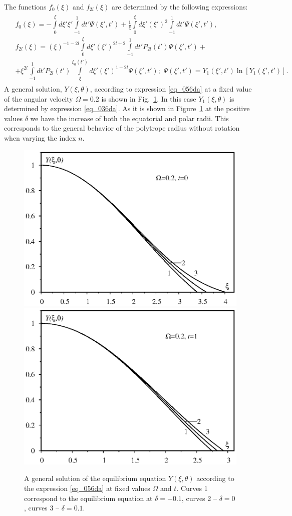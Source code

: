 \documentclass{caosp308}
\begin{document}
The functions $f_0(\xi)$ and $f_{2l}(\xi)$ are determined by the following expressions:
\begin{eqnarray}
\label{eq_057da}
\begin{split}
& f_{0}(\xi)=-\int\limits_0^{\xi}d\xi'\xi'\int\limits_{-1}^{1}dt'\Psi(\xi',t')+\frac{1}{\xi}\int\limits_0^\xi d\xi'(\xi')^2
\int\limits_{-1}^{1}dt'\Psi(\xi',t'),\\
& f_{2l}(\xi)=(\xi)^{-1-2l}\int\limits_0^\xi d\xi'(\xi')^{2l+2}\int\limits_{-1}^{1}dt'P_{2l}(t')\Psi(\xi',t')+\\
&+\xi^{2l}\int\limits_{-1}^{1}dt'P_{2l}(t')\int\limits_{\xi}^{\xi_0(t')}d\xi'(\xi')^{1-2l}\Psi(\xi',t');\,\,
\Psi(\xi',t')=Y_1(\xi',t')\ln{[Y_1(\xi',t')]}.
\end{split}
\end{eqnarray}
A general solution, $Y(\xi,\theta)$, according to expression \eqref{eq_056da} at a fixed value of the angular velocity $\Omega=0.2$ is shown in Fig.~\ref{fig_05da}. In this case $Y_1(\xi,\theta)$ is determined by expression \eqref{eq_036da}. As it is shown in Figure~\ref{fig_05da} at the positive values $\delta$ we have the increase of both the equatorial and polar radii. This corresponds to the general behavior of the polytrope radius without rotation when varying the index $n$.
\begin{figure}[h!]
\includegraphics[width=.5\textwidth]{fig_05a.eps}\hfil
\includegraphics[width=.5\textwidth]{fig_05b.eps}
\caption{A general solution of the equilibrium equation $Y(\xi,\theta)$ according to the expression \eqref{eq_056da} at fixed values $\Omega$ and $t$. Curves 1 correspond to the equilibrium equation at $\delta=-0.1$, curves 2 -- $\delta=0$, curves 3 -- $\delta=0.1$.}
\label{fig_05da}
\end{figure}
\end{document}
